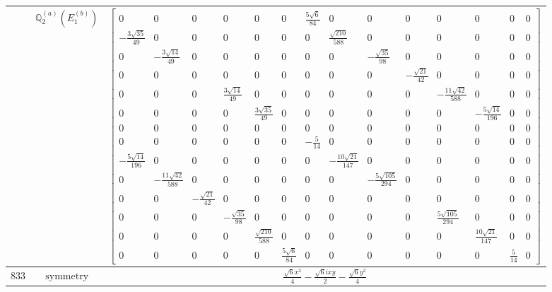 \documentclass[fleqn,8pt,landscape]{jsarticle}
\begin{document}
\begin{longtable}{ccc}
$  $ & $ \mathbb{Q}_{2}^{(a)}(E_{1}^{(b)}) $ & $ \begin{bmatrix} 0 & 0 & 0 & 0 & 0 & 0 & \frac{5 \sqrt{6}}{84} & 0 & 0 & 0 & 0 & 0 & 0 & 0 \\ - \frac{3 \sqrt{35}}{49} & 0 & 0 & 0 & 0 & 0 & 0 & \frac{\sqrt{210}}{588} & 0 & 0 & 0 & 0 & 0 & 0 \\ 0 & - \frac{3 \sqrt{14}}{49} & 0 & 0 & 0 & 0 & 0 & 0 & - \frac{\sqrt{35}}{98} & 0 & 0 & 0 & 0 & 0 \\ 0 & 0 & 0 & 0 & 0 & 0 & 0 & 0 & 0 & - \frac{\sqrt{21}}{42} & 0 & 0 & 0 & 0 \\ 0 & 0 & 0 & \frac{3 \sqrt{14}}{49} & 0 & 0 & 0 & 0 & 0 & 0 & - \frac{11 \sqrt{42}}{588} & 0 & 0 & 0 \\ 0 & 0 & 0 & 0 & \frac{3 \sqrt{35}}{49} & 0 & 0 & 0 & 0 & 0 & 0 & - \frac{5 \sqrt{14}}{196} & 0 & 0 \\ 0 & 0 & 0 & 0 & 0 & 0 & 0 & 0 & 0 & 0 & 0 & 0 & 0 & 0 \\ 0 & 0 & 0 & 0 & 0 & 0 & - \frac{5}{14} & 0 & 0 & 0 & 0 & 0 & 0 & 0 \\ - \frac{5 \sqrt{14}}{196} & 0 & 0 & 0 & 0 & 0 & 0 & - \frac{10 \sqrt{21}}{147} & 0 & 0 & 0 & 0 & 0 & 0 \\ 0 & - \frac{11 \sqrt{42}}{588} & 0 & 0 & 0 & 0 & 0 & 0 & - \frac{5 \sqrt{105}}{294} & 0 & 0 & 0 & 0 & 0 \\ 0 & 0 & - \frac{\sqrt{21}}{42} & 0 & 0 & 0 & 0 & 0 & 0 & 0 & 0 & 0 & 0 & 0 \\ 0 & 0 & 0 & - \frac{\sqrt{35}}{98} & 0 & 0 & 0 & 0 & 0 & 0 & \frac{5 \sqrt{105}}{294} & 0 & 0 & 0 \\ 0 & 0 & 0 & 0 & \frac{\sqrt{210}}{588} & 0 & 0 & 0 & 0 & 0 & 0 & \frac{10 \sqrt{21}}{147} & 0 & 0 \\ 0 & 0 & 0 & 0 & 0 & \frac{5 \sqrt{6}}{84} & 0 & 0 & 0 & 0 & 0 & 0 & \frac{5}{14} & 0 \end{bmatrix} $ \\ \hline
$ 833 $ & $ \text{symmetry} $ & $ \frac{\sqrt{6} x^{2}}{4} - \frac{\sqrt{6} i x y}{2} - \frac{\sqrt{6} y^{2}}{4} $ \\

\end{longtable}
\end{document}
